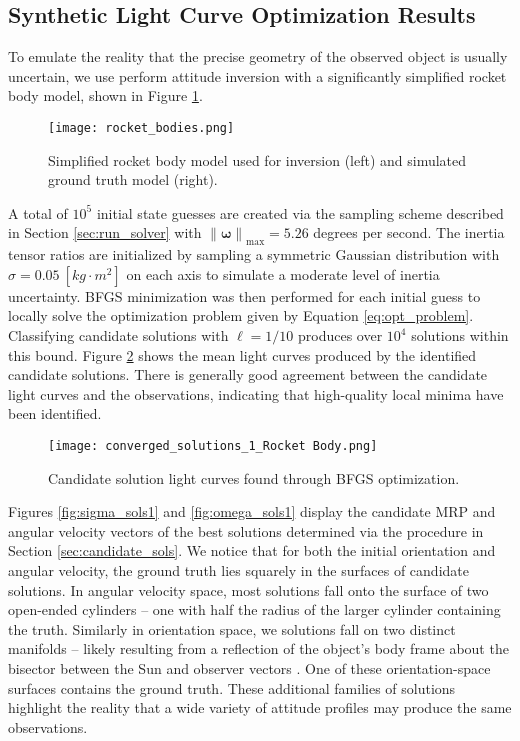 \documentclass[a4paper,twocolumn]{spaceDebrisC} %
\newcommand{\vctr}[1]{\bm{#1}}
\newcommand{\norm}[1]{\left\lVert#1\right\rVert}
\newcommand{\figmed}[0]{0.4\textwidth}
\begin{document}
\subsection{Synthetic Light Curve Optimization Results}

To emulate the reality that the precise geometry of the observed object is usually uncertain, we use perform attitude inversion with a significantly simplified rocket body model, shown in Figure \ref{fig:rb_models}.

\begin{figure}[H]
  \centering
  \texttt{[image: rocket\_bodies.png]}
  \caption{Simplified rocket body model used for inversion (left) and simulated ground truth model (right).}
  \label{fig:rb_models}
\end{figure}

A total of $10^5$ initial state guesses are created via the sampling scheme described in Section \ref{sec:run_solver} with $\norm{\vctr{\omega}}_\text{max}=5.26$ degrees per second. The inertia tensor ratios are initialized by sampling a symmetric Gaussian distribution with $\sigma=0.05 \: [kg\cdot m^2]$ on each axis to simulate a moderate level of inertia uncertainty. BFGS minimization was then performed for each initial guess to locally solve the optimization problem given by Equation \ref{eq:opt_problem}. Classifying candidate solutions with $\ell = 1/10$ produces over $10^4$ solutions within this bound. Figure \ref{fig:conv_lcs_synth} shows the mean light curves produced by the identified candidate solutions. There is generally good agreement between the candidate light curves and the observations, indicating that high-quality local minima have been identified.

\begin{figure}[H]
  \centering
  \texttt{[image: converged\_solutions\_1\_Rocket Body.png]}
  \caption{Candidate solution light curves found through BFGS optimization.}
  \label{fig:conv_lcs_synth}
\end{figure}

Figures \ref{fig:sigma_sols1} and \ref{fig:omega_sols1} display the candidate MRP and angular velocity vectors of the best solutions determined via the procedure in Section \ref{sec:candidate_sols}. We notice that for both the initial orientation and angular velocity, the ground truth lies squarely in the surfaces of candidate solutions. In angular velocity space, most solutions fall onto the surface of two open-ended cylinders -- one with half the radius of the larger cylinder containing the truth. Similarly in orientation space, we solutions fall on two distinct manifolds -- likely resulting from a reflection of the object's body frame about the bisector between the Sun and observer vectors \cite{marto2024, burton2024journal}. One of these orientation-space surfaces contains the ground truth. These additional families of solutions highlight the reality that a wide variety of attitude profiles may produce the same observations.
\end{document}
